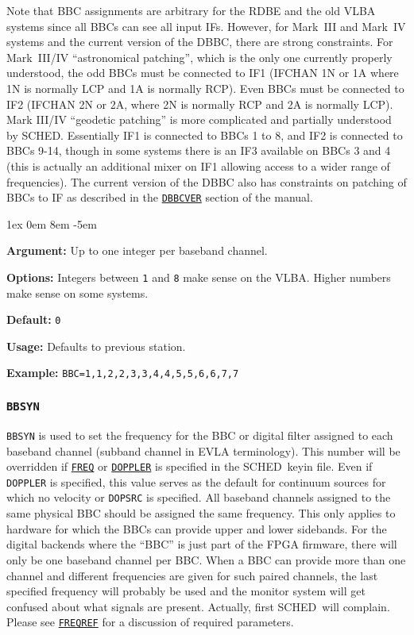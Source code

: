 \documentclass{report}
\newcommand{\sched}{{\sc SCHED}}
\newcommand{\schedb}{{\sc SCHED~}}
\newcommand{\rcwbox}[5]{
  \begin{list}{}{\parsep 1ex  \itemsep 0em
                 \leftmargin 8em  \itemindent -5em }
    \item {\bf Argument:} #1
    \item {\bf Options:}  #2
    \item {\bf Default:}  #3
    \item {\bf Usage:}    #4
    \item {\bf Example:}  #5
  \end{list}
}
\begin{document}
Note that BBC assignments are arbitrary for the RDBE and the old VLBA
systems since all BBCs can see all input IFs.  However, for Mark~III and
Mark~IV systems and the current version of the DBBC, there are strong
constraints.  For Mark~III/IV ``astronomical patching'', which is the
only one currently properly understood, the odd BBCs must be connected
to IF1 (IFCHAN 1N or 1A where 1N is normally LCP and 1A is normally
RCP).  Even BBCs must be connected to IF2 (IFCHAN 2N or 2A, where 2N is
normally RCP and 2A is normally LCP). Mark III/IV ``geodetic patching''
is more complicated and partially understood by \sched. Essentially IF1
is connected to BBCs 1 to 8, and IF2 is connected to BBCs 9-14, though
in some systems there is an IF3 available on BBCs 3 and 4 (this is
actually an additional mixer on IF1 allowing access to a wider range of
frequencies). The current version of the DBBC also has constraints on
patching of BBCs to IF as described in the 
{\hyperref[SSEC:DBBC]{{\tt DBBCVER}}} section of the manual.

\rcwbox
{Up to one integer per baseband channel.}
{Integers between {\tt 1} and {\tt 8} make sense on the VLBA.  Higher
numbers make sense on some systems.}
{{\tt 0}}
{Defaults to previous station.}
{{\tt BBC=1,1,2,2,3,3,4,4,5,5,6,6,7,7}}


\subsubsection{\label{SP:BBSYN}{\tt BBSYN}}

{\tt BBSYN} is used to set the frequency for the BBC or digital filter
assigned to each baseband channel (subband channel in EVLA
terminology). This number will be overridden if 
{\hyperref[MP:FREQ]{{\tt FREQ}}} or 
{\hyperref[MP:DOPPLER]{{\tt DOPPLER}}} is specified in the
\schedb keyin file. Even if {\tt DOPPLER} is specified, this value
serves as the default for continuum sources for which no velocity or
{\tt DOPSRC} is specified. All baseband channels assigned to the same
physical BBC should be assigned the same frequency.  This only applies
to hardware for which the BBCs can provide upper and lower sidebands.
For the digital backends where the ``BBC'' is just part of the FPGA
firmware, there will only be one baseband channel per BBC.  When a BBC
can provide more than one channel and different frequencies are given
for such paired channels, the last specified frequency will probably
be used and the monitor system will get confused about what signals
are present. Actually, first \schedb will complain.  Please see
{\hyperref[SP:FREQREF]{{\tt FREQREF}}} for a discussion of required
parameters.
\end{document}

